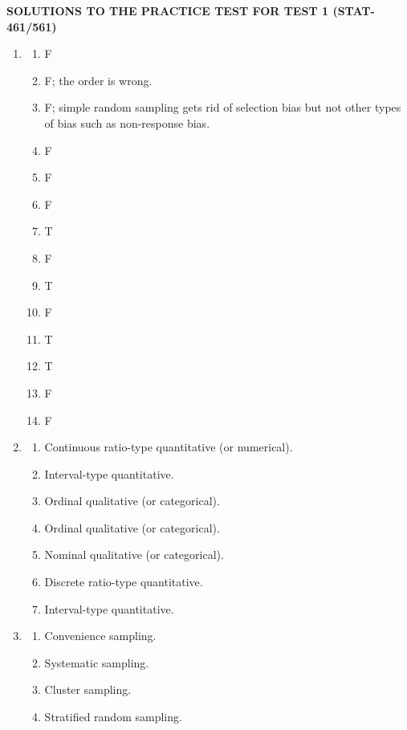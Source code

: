 \documentclass[12pt]{article}
\begin{document}
\begin{center}
    {\Large \textbf{SOLUTIONS TO THE PRACTICE TEST FOR TEST 1 (STAT-461/561)}}
\end{center}

\begin{enumerate}[label=(\arabic*), leftmargin=*]

\item
\begin{enumerate}[label=(\alph*)]
    \item F
    \item F; the order is wrong.
    \item F; simple random sampling gets rid of selection bias but not other types of bias such as non-response bias.
    \item F
    \item F
    \item F
    \item T
    \item F
    \item T
    \item F
    \item T
    \item T
    \item F
    \item F
\end{enumerate}

\item
\begin{enumerate}[label=(\alph*)]
    \item Continuous ratio-type quantitative (or numerical).
    \item Interval-type quantitative.
    \item Ordinal qualitative (or categorical).
    \item Ordinal qualitative (or categorical).
    \item Nominal qualitative (or categorical).
    \item Discrete ratio-type quantitative.
    \item Interval-type quantitative.
\end{enumerate}

\item
\begin{enumerate}[label=(\alph*)]
    \item Convenience sampling.
    \item Systematic sampling.
    \item Cluster sampling.
    \item Stratified random sampling.
\end{enumerate}


\end{enumerate}
\end{document}
